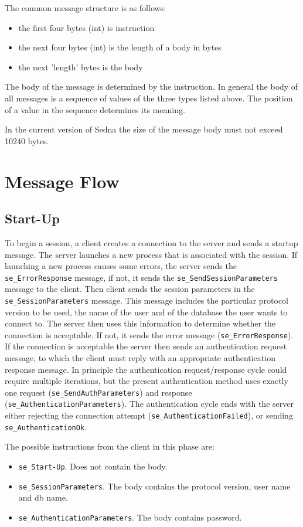 \documentclass[a4paper,12pt]{article}
\begin{document}
The common message structure is as follows:
\begin{itemize}
\item the first four bytes (int) is instruction
\item the next four bytes (int) is the length of a body in bytes
\item the next 'length' bytes is the body
\end{itemize}

The body of the message is determined by the instruction. In general the body of all messages is a sequence of values of the three types listed above. The position of a value in the sequence determines its meaning.

In the current version of Sedna the size of the message body must not exceed 10240 bytes.
\newpage
\section{Message Flow}
\label{sec:MessageFlow}
\subsection{Start-Up}

To begin a session, a client creates a connection to the server and sends a startup message. The server launches a new process that is associated with the session. If launching a new process causes some errors, the server sends the \verb!se_ErrorResponse! message, if not, it sends the \verb!se_SendSessionParameters! message to the client. Then client sends the session parameters in the \verb!se_SessionParameters! message. This message includes the particular protocol version to be used, the name of the user and of the database the user wants to connect to. The server then uses this information to determine whether the connection is acceptable. If not, it sends the error message (\verb!se_ErrorResponse!). If the connection is acceptable the server then sends an authentication request message, to which the client must reply with an appropriate authentication response message. In principle the authentication request/response cycle could require multiple iterations, but the present authentication method uses exactly one request (\verb!se_SendAuthParameters!) and response (\verb!se_AuthenticationParameters!). The authentication cycle ends with the server either rejecting the connection attempt (\verb!se_AuthenticationFailed!), or sending \verb!se_AuthenticationOk!.

The possible instructions from the client in this phase are:
\begin{itemize}
\item \verb!se_Start-Up!. Does not contain the body.
\item \verb!se_SessionParameters!. The body contains the protocol version, user name and db name.
\item \verb!se_AuthenticationParameters!. The body contains password.
\end{itemize}
\end{document}
